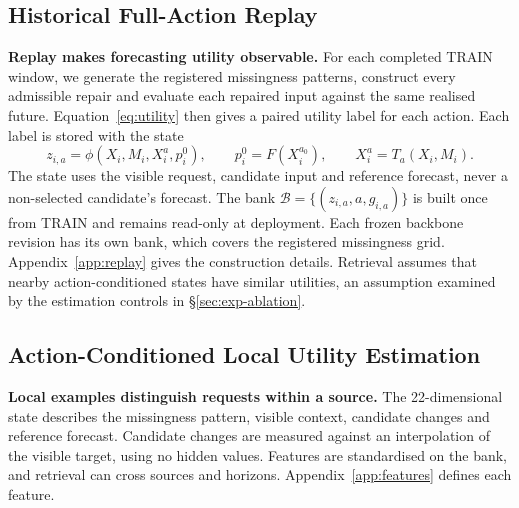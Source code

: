 \documentclass{article}
\newcommand{\calB}{\mathcal{B}}
\begin{document}
\subsection{Historical Full-Action Replay}
\label{sec:method-replay}
\textbf{Replay makes forecasting utility observable.} For each completed TRAIN window,
we generate the registered missingness patterns, construct every admissible repair and
evaluate each repaired input against the same realised future. Equation~\eqref{eq:utility}
then gives a paired utility label for each action. Each label is stored with the state
\begin{equation}
z_{i,a}=\phi(X_i,M_i,X_i^a,p_i^0),\qquad
p_i^0=F(X_i^{a_0}),\qquad X_i^a=T_a(X_i,M_i).
\label{eq:state}
\end{equation}
The state uses the visible request, candidate input and reference forecast, never a
non-selected candidate's forecast. The bank $\calB=\{(z_{i,a},a,g_{i,a})\}$ is built once
from TRAIN and remains read-only at deployment. Each frozen backbone revision has its own
bank, which covers the registered missingness grid. Appendix~\ref{app:replay} gives the
construction details. Retrieval assumes that nearby action-conditioned states have similar
utilities, an assumption examined by the estimation controls in \S\ref{sec:exp-ablation}.

\subsection{Action-Conditioned Local Utility Estimation}
\label{sec:method-scoring}
\textbf{Local examples distinguish requests within a source.} The 22-dimensional state
describes the missingness pattern, visible context, candidate changes and reference forecast.
Candidate changes are measured against an interpolation of the visible target, using no
hidden values. Features are standardised on the bank, and retrieval can cross sources and
horizons. Appendix~\ref{app:features} defines each feature.
\end{document}
